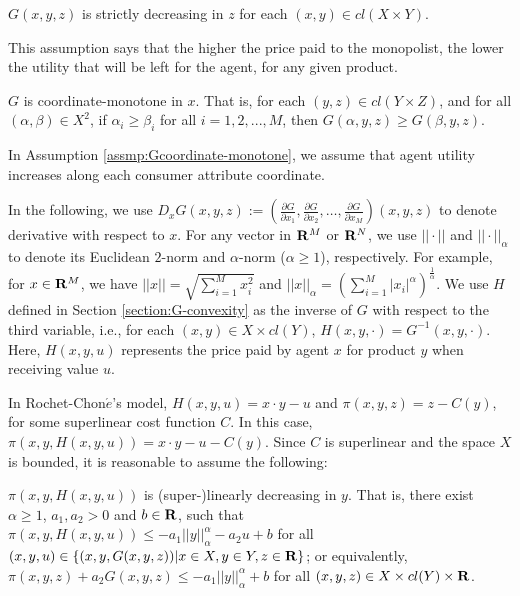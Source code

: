 \begin{assumption}\label{assmp:Gdecreasing}
	$G(x,y,z)$ is strictly decreasing in $z$ %
	for each $(x,y) \in cl(X \times Y)$.
\end{assumption}





This assumption says that the higher the price paid to the monopolist, the lower the utility that will be left for the agent, for any given product. %
\medskip


\begin{assumption}\label{assmp:Gcoordinate-monotone}
	$G$ is coordinate-monotone
	in $x$. That is, for each $(y,z)\in cl(Y\times Z)$, and for all $ (\alpha, \beta) \in X^2$, if $\alpha_i\ge \beta_i$ for all $ i=1,2,...,M$, then $G(\alpha,y,z)\ge G(\beta, y,z)$.
\end{assumption}


In Assumption \ref{assmp:Gcoordinate-monotone}, we assume that agent utility increases along each consumer attribute coordinate.\medskip



 {In the following, we use  $D_x G(x,y,z) := (\frac{\partial G}{\partial x_1}, \frac{\partial G}{\partial x_2}, \dots, \frac{\partial G}{\partial x_M})(x,y,z)$ to denote derivative with respect to $x$. For any vector in ${\mathbf R}^M$ or ${\mathbf R}^N$, we use $||\cdot||$ and $||\cdot||_{\alpha}$ to denote its Euclidean  $2$-norm and $\alpha$-norm ($\alpha \ge 1$), respectively. For example, for $x\in {\mathbf R}^M$, we have $||x|| = \sqrt{\sum_{i=1}^{M} x_i^2}$ and $||x||_{\alpha} = (\sum_{i=1}^{M} |x_i|^{\alpha})^{\frac{1}{\alpha}}$. 
 We use $H$ defined in Section \ref{section:G-convexity} as the inverse of $G$ with respect to the third variable, i.e., for each $(x, y) \in X\times cl(Y)$, $H(x, y, \cdot)= G^{-1}(x,y,\cdot)$. Here, $H(x,y,u)$ represents the price paid by agent $x$ for product $y$ when receiving value $u$.}\medskip

In Rochet-Chon$\acute{e}$'s model, $H(x,y,u) = x\cdot y -u$ and $\pi(x,y,z) = z-C(y)$, for some superlinear cost function $C$. In this case, $\pi(x,y,H(x,y,u)) = x\cdot y -u -C(y)$. Since $C$ is superlinear and the space $X$ is bounded, it is reasonable to assume the following:\medskip


\begin{assumption}\label{assmp:Gtech0}
	$\pi(x,y,H(x,y,u))$ is (super-)linearly decreasing in $y$. That is, there exist $\alpha \ge 1$, $a_1, a_2> 0$ and $b\in {\mathbf R}$, such that $\pi(x,y,H(x,y,u)) \le -a_1 ||y||_{\alpha}^{\alpha} - a_2 u +b$ for all $ (x, y, u)\in \{ (x,y, G(x,y,z))| x\in X, y\in Y, z\in {\mathbf R} \}$; or equivalently, $\pi(x,y,z) + a_2 G(x,y,z) \le -a_1 ||y||_{\alpha}^{\alpha}  +b$ for all $ (x, y, z)\in X\times cl(Y)\times {\mathbf R}$.
\end{assumption}


